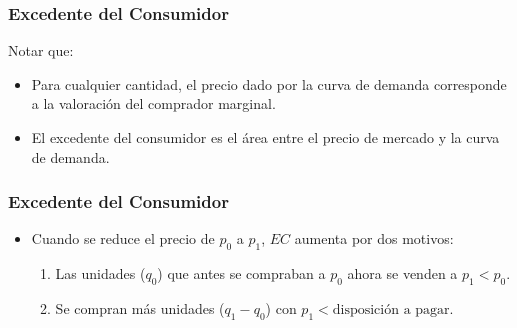 \documentclass{beamer}
\newcommand{\peq}[1]{{\scriptscriptstyle{#1}}}
\begin{document}
		\begin{frame}
			\frametitle{Excedente del Consumidor}
			Notar que:
			\begin{itemize}
				\item Para cualquier cantidad, el precio dado por la curva de demanda corresponde a la valoración del comprador marginal.
				\item El excedente del consumidor es el área entre el precio de mercado y la curva de demanda.
			\end{itemize}
		\end{frame}

		\begin{frame}
			\frametitle{Excedente del Consumidor}
			\begin{itemize}
				\item Cuando se reduce el precio de $p_\peq{0}$ a $p_\peq{1}$, $EC$ aumenta por dos motivos:
					\begin{enumerate}
						\item Las unidades ($q_\peq{0}$) que antes se compraban a $p_\peq{0}$ ahora se venden a $p_\peq{1}<p_\peq{0}$.
						\item Se compran más unidades ($q_\peq{1}-q_\peq{0}$) con $p_\peq{1}<\text{disposición a pagar}$.
					\end{enumerate}
			\end{itemize}
		\end{frame}
\end{document}

